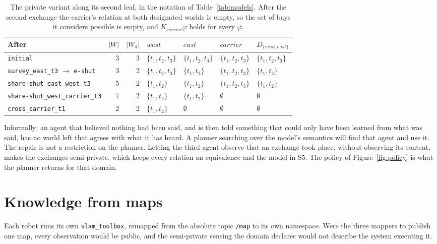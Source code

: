 \documentclass[11pt,a4paper]{article}
\theoremstyle{definition}
\newcommand{\Kop}[1]{K_{#1}}
\newcommand{\code}[1]{\texttt{\small #1}}
\newcommand{\ag}[1]{\mathit{#1}}
\begin{document}
\begin{table}[H]
\centering\footnotesize
\caption{The private variant along its second leaf, in the notation of
Table~\ref{tab:models}. After the second exchange the carrier's relation at
both designated worlds is empty, so the set of bays it considers possible is
empty, and $\Kop{\ag{carrier}}\varphi$ holds for every $\varphi$.}
\label{tab:private}
\setlength{\tabcolsep}{4pt}
\begin{tabular}{@{}lrrllll@{}}
\toprule
\textbf{After} & $|W|$ & $|W_d|$ & $\ag{west}$ & $\ag{east}$ & $\ag{carrier}$ & $D_{\{\ag{west},\ag{east}\}}$ \\
\midrule
\code{initial} & 3 & 3 & $\{t_1, t_2, t_3\}$ & $\{t_1, t_2, t_3\}$ & $\{t_1, t_2, t_3\}$ & $\{t_1, t_2, t_3\}$ \\
\code{survey\_east\_t3} $\to$ \code{e-shut} & 3 & 2 & $\{t_1, t_2, t_3\}$ & $\{t_1, t_2\}$ & $\{t_1, t_2, t_3\}$ & $\{t_1, t_2\}$ \\
\code{share-shut\_east\_west\_t3} & 5 & 2 & $\{t_1, t_2\}$ & $\{t_1, t_2\}$ & $\{t_1, t_2, t_3\}$ & $\{t_1, t_2\}$ \\
\code{share-shut\_west\_carrier\_t3} & 7 & 2 & $\{t_1, t_2\}$ & $\{t_1, t_2\}$ & $\emptyset$ & $\emptyset$ \\
\code{cross\_carrier\_t1} & 2 & 2 & $\{t_1, t_2\}$ & $\emptyset$ & $\emptyset$ & $\emptyset$ \\
\bottomrule
\end{tabular}
\end{table}

Informally: an agent that believed nothing had been said, and is then told
something that could only have been learned from what was said, has no world
left that agrees with what it has heard. A planner searching over the model's
semantics will find that agent and use it. The repair is not a restriction on
the planner. Letting the third agent observe that an exchange took place,
without observing its content, makes the exchanges semi-private, which keeps
every relation an equivalence and the model in $\mathrm{S5}$. The policy of
Figure~\ref{fig:policy} is what the planner returns for that domain.

\section{Knowledge from maps}
\label{sec:maps}

Each robot runs its own \code{slam\_toolbox}, remapped from the absolute topic
\code{/map} to its own namespace. Were the three mappers to publish one map,
every observation would be public, and the semi-private sensing the domain
declares would not describe the system executing it.
\end{document}
